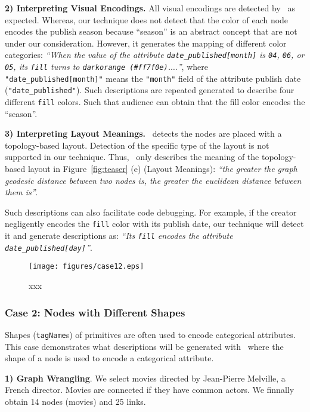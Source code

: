 \textbf{2) Interpreting Visual Encodings.} All visual encodings are detected by \ApproachName~as expected.
Whereas, our technique does not detect that the color of each node encodes the publish season because ``season'' is an abstract concept that are not under our consideration.
However, it generates the mapping of different color categories: 
\textit{``When the value of the attribute {\texttt{date\_published[month]}} is {\texttt{04}}, {\texttt{06}}, or {\texttt{05}}, 
its {\texttt{fill}} turns to {\texttt{darkorange (\#ff7f0e)}}.$\ldots$''}, 
where \texttt{"date\_published[month]"} means the \texttt{"month"} field of the attribute publish date (\texttt{"date\_published"}).
Such descriptions are repeated generated to describe four different \texttt{fill} colors.
Such that audience can obtain that the fill color encodes the ``season''.

\textbf{3) Interpreting Layout Meanings.} \ApproachName~detects the nodes are placed with a topology-based layout. 
Detection of the specific type of the layout is not supported in our technique.
Thus, \ApproachName~only describes the meaning of the topology-based layout in Figure~\ref{fig:teaser} (e) (Layout Meanings): \textit{``the greater the graph geodesic distance between two nodes is, the greater the euclidean distance between them is''}.

Such descriptions can also facilitate code debugging. 
For example, if the creator negligently encodes the \texttt{fill} color with its publish date,
our technique will detect it and generate descriptions as: \textit{``Its \texttt{fill} encodes the attribute \texttt{date\_published[day]}''}.

\begin{figure*}[ht]
    \centering
    \texttt{[image: figures/case12.eps]}
    \caption{xxx}
    \label{fig:case12}
\end{figure*}

\subsubsection{Case 2: Nodes with Different Shapes}
Shapes (\texttt{tagName}s) of primitives are often used to encode categorical attributes.
This case demonstrates what descriptions will be generated with \ApproachName~where the shape of a node is used to encode a categorical attribute.

\textbf{1) Graph Wrangling}. 
We select movies directed by Jean-Pierre Melville, a French director. 
Movies are connected if they have common actors. 
We finnally obtain 14 nodes (movies) and 25 links.

